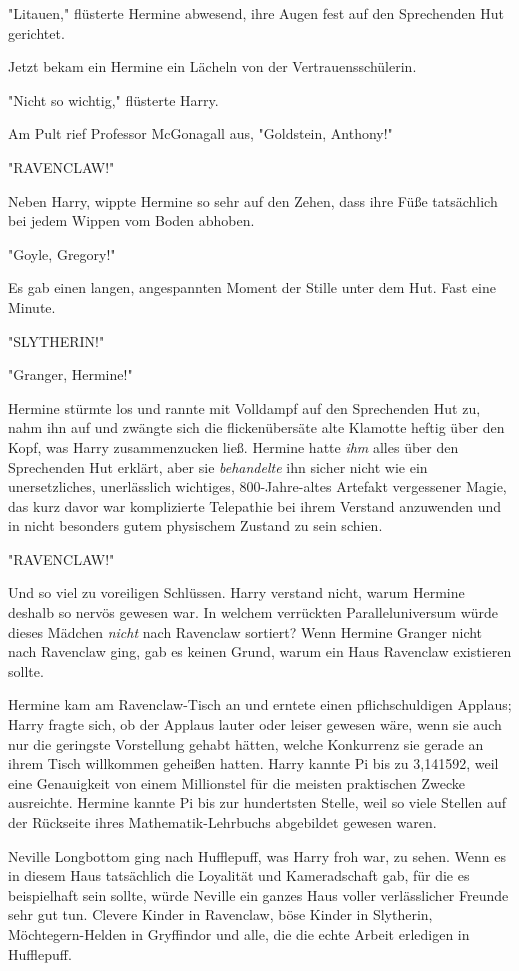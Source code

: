 {"Litauen," flüsterte Hermine abwesend, ihre Augen fest auf den Sprechenden Hut gerichtet.

Jetzt bekam ein Hermine ein Lächeln von der Vertrauensschülerin.

"Nicht so wichtig," flüsterte Harry.

Am Pult rief Professor McGonagall aus, "Goldstein, Anthony!"

"RAVENCLAW!"

Neben Harry, wippte Hermine so sehr auf den Zehen, dass ihre Füße tatsächlich bei jedem Wippen vom Boden abhoben.

"Goyle, Gregory!"

Es gab einen langen, angespannten Moment der Stille unter dem Hut. Fast eine Minute.

"SLYTHERIN!"

"Granger, Hermine!"

Hermine stürmte los und rannte mit Volldampf auf den Sprechenden Hut zu, nahm ihn auf und zwängte sich die flickenübersäte alte Klamotte heftig über den Kopf, was Harry zusammenzucken ließ. Hermine hatte \emph{ihm} alles über den Sprechenden Hut erklärt, aber sie \emph{behandelte} ihn sicher nicht wie ein unersetzliches, unerlässlich wichtiges, 800-Jahre-altes Artefakt vergessener Magie, das kurz davor war komplizierte Telepathie bei ihrem Verstand anzuwenden und in nicht besonders gutem physischem Zustand zu sein schien.

"RAVENCLAW!"

Und so viel zu voreiligen Schlüssen. Harry verstand nicht, warum Hermine deshalb so nervös gewesen war. In welchem verrückten Paralleluniversum würde dieses Mädchen \emph{nicht} nach Ravenclaw sortiert? Wenn Hermine Granger nicht nach Ravenclaw ging, gab es keinen Grund, warum ein Haus Ravenclaw existieren sollte.

Hermine kam am Ravenclaw-Tisch an und erntete einen pflichschuldigen Applaus; Harry fragte sich, ob der Applaus lauter oder leiser gewesen wäre, wenn sie auch nur die geringste Vorstellung gehabt hätten, welche Konkurrenz sie gerade an ihrem Tisch willkommen geheißen hatten. Harry kannte Pi bis zu 3,141592, weil eine Genauigkeit von einem Millionstel für die meisten praktischen Zwecke ausreichte. Hermine kannte Pi bis zur hundertsten Stelle, weil so viele Stellen auf der Rückseite ihres Mathematik-Lehrbuchs abgebildet gewesen waren.

Neville Longbottom ging nach Hufflepuff, was Harry froh war, zu sehen. Wenn es in diesem Haus tatsächlich die Loyalität und Kameradschaft gab, für die es beispielhaft sein sollte, würde Neville ein ganzes Haus voller verlässlicher Freunde sehr gut tun. Clevere Kinder in Ravenclaw, böse Kinder in Slytherin, Möchtegern-Helden in Gryffindor und alle, die die echte Arbeit erledigen in Hufflepuff.

}
